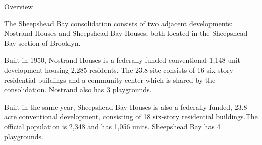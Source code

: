 Overview

The Sheepshead Bay consolidation consists of two adjacent developments: Nostrand Houses and Sheepshead Bay Houses, both located in the Sheepshead Bay section of Brooklyn. 

Built in 1950, Nostrand Houses is a federally-funded conventional 1,148-unit development housing 2,285 residents. The 23.8-site consists of 16 six-story residential buildings and a community center which is shared by the consolidation. Nostrand also has 3 playgrounds.

Built in the same year, Sheepshead Bay Houses is also a federally-funded, 23.8-acre conventional development, consisting of 18 six-story residential buildings.The official population is 2,348 and has 1,056 units. Sheepshead Bay has 4 playgrounds. 